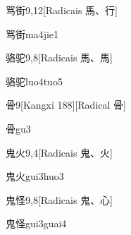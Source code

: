 \begin{entry}{骂街}{9,12}[Radicais ⾺、⾏]
  \begin{phonetics}{骂街}{ma4jie1}
  \end{phonetics}
\end{entry}

\begin{entry}{骆驼}{9,8}[Radicais ⾺、⾺]
  \begin{phonetics}{骆驼}{luo4tuo5}
  \end{phonetics}
\end{entry}

\begin{entry}{骨}{9}[Kangxi 188][Radical ⾻]
  \begin{phonetics}{骨}{gu3}
  \end{phonetics}
\end{entry}

\begin{entry}{鬼火}{9,4}[Radicais ⿁、⽕]
  \begin{phonetics}{鬼火}{gui3huo3}
  \end{phonetics}
\end{entry}

\begin{entry}{鬼怪}{9,8}[Radicais ⿁、⼼]
  \begin{phonetics}{鬼怪}{gui3guai4}
  \end{phonetics}
\end{entry}


